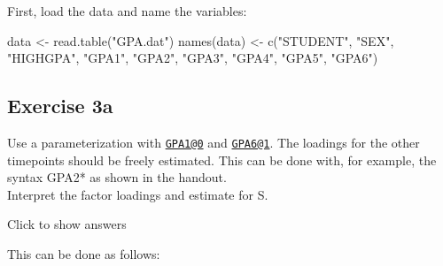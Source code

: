 \documentclass[
]{book}
\newenvironment{Shaded}{\begin{snugshade}}{\end{snugshade}}
\newcommand{\FunctionTok}[1]{\textcolor[rgb]{0.00,0.00,0.00}{#1}}
\newcommand{\NormalTok}[1]{#1}
\newcommand{\OtherTok}[1]{\textcolor[rgb]{0.56,0.35,0.01}{#1}}
\newcommand{\StringTok}[1]{\textcolor[rgb]{0.31,0.60,0.02}{#1}}
\begin{document}
First, load the data and name the variables:

\begin{Shaded}
\begin{Highlighting}[]
\NormalTok{data }\OtherTok{\textless{}{-}} \FunctionTok{read.table}\NormalTok{(}\StringTok{"GPA.dat"}\NormalTok{)}
\FunctionTok{names}\NormalTok{(data) }\OtherTok{\textless{}{-}} \FunctionTok{c}\NormalTok{(}\StringTok{"STUDENT"}\NormalTok{, }\StringTok{"SEX"}\NormalTok{, }\StringTok{"HIGHGPA"}\NormalTok{,}
                 \StringTok{"GPA1"}\NormalTok{, }\StringTok{"GPA2"}\NormalTok{, }\StringTok{"GPA3"}\NormalTok{, }\StringTok{"GPA4"}\NormalTok{, }\StringTok{"GPA5"}\NormalTok{, }\StringTok{"GPA6"}\NormalTok{)}
\end{Highlighting}
\end{Shaded}

\hypertarget{exercise-3a}{%
\subsection{Exercise 3a}\label{exercise-3a}}

Use a parameterization with \href{mailto:GPA1@0}{\nolinkurl{GPA1@0}} and \href{mailto:GPA6@1}{\nolinkurl{GPA6@1}}. The loadings for the other timepoints should be freely estimated. This can
be done with, for example, the syntax GPA2* as shown in the handout.\\
Interpret the factor loadings and estimate for S.

Click to show answers

This can be done as follows:
\end{document}

